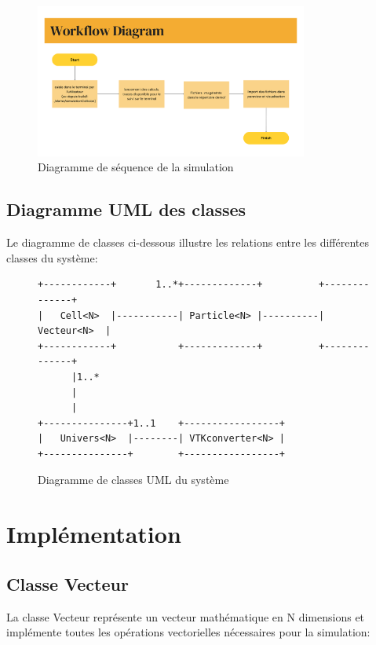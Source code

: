 \documentclass[12pt,a4paper]{article}
\begin{document}
\begin{figure}[H]
\centering
\includegraphics[width=0.8\textwidth]{assets/diagrammeSequence.png}
\caption{Diagramme de séquence de la simulation}
\end{figure}


\subsection{Diagramme UML des classes}

Le diagramme de classes ci-dessous illustre les relations entre les différentes classes du système:

\begin{figure}[H]
\centering
\begin{minipage}{\textwidth}
\begin{verbatim}
+------------+       1..*+-------------+          +--------------+
|   Cell<N>  |-----------| Particle<N> |----------|  Vecteur<N>  |
+------------+           +-------------+          +--------------+
      |1..*
      |
      |
+---------------+1..1    +-----------------+
|   Univers<N>  |--------| VTKconverter<N> |
+---------------+        +-----------------+
\end{verbatim}
\end{minipage}
\caption{Diagramme de classes UML du système}
\end{figure}

\section{Implémentation}

\subsection{Classe Vecteur}

La classe Vecteur représente un vecteur mathématique en N dimensions et implémente toutes les opérations vectorielles nécessaires pour la simulation:
\end{document}
